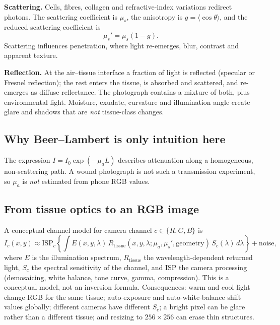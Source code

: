 \documentclass[12pt,a4paper]{article}
\begin{document}
\textbf{Scattering.} Cells, fibres, collagen and refractive-index variations redirect photons. The scattering coefficient is $\mu_s$, the anisotropy is $g=\langle\cos\theta\rangle$, and the reduced scattering coefficient is
\begin{equation}
\mu_s' = \mu_s(1-g).
\end{equation}
Scattering influences penetration, where light re-emerges, blur, contrast and apparent texture.

\textbf{Reflection.} At the air--tissue interface a fraction of light is reflected (specular or Fresnel reflection); the rest enters the tissue, is absorbed and scattered, and re-emerges as diffuse reflectance. The photograph contains a mixture of both, plus environmental light. Moisture, exudate, curvature and illumination angle create glare and shadows that are \emph{not} tissue-class changes.

\subsection{Why Beer--Lambert is only intuition here}
The expression $I=I_0\exp(-\mu_a L)$ describes attenuation along a homogeneous, non-scattering path. A wound photograph is not such a transmission experiment, so $\mu_a$ is \emph{not} estimated from phone RGB values.

\subsection{From tissue optics to an RGB image}
A conceptual channel model for camera channel $c\in\{R,G,B\}$ is
\begin{equation}
I_c(x,y)\approx \mathrm{ISP}_c\!\left\{\int E(x,y,\lambda)\,R_{\text{tissue}}(x,y,\lambda;\mu_a,\mu_s',\text{geometry})\,S_c(\lambda)\,d\lambda\right\}+\text{noise},
\end{equation}
where $E$ is the illumination spectrum, $R_{\text{tissue}}$ the wavelength-dependent returned light, $S_c$ the spectral sensitivity of the channel, and ISP the camera processing (demosaicing, white balance, tone curve, gamma, compression). This is a conceptual model, not an inversion formula. Consequences: warm and cool light change RGB for the same tissue; auto-exposure and auto-white-balance shift values globally; different cameras have different $S_c$; a bright pixel can be glare rather than a different tissue; and resizing to $256\times256$ can erase thin structures.
\end{document}
